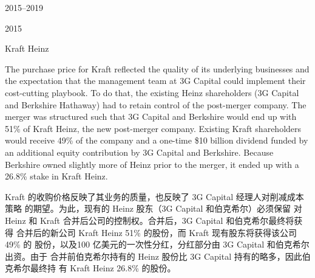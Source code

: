 \begin{chapter}{2015--2019}
\begin{section}{2015}
\begin{subsection}{Kraft Heinz}
\begin{verseparallel}
  {

    The purchase price for Kraft reflected the quality of its underlying
    businesses and the expectation that the management team at 3G Capital could
    implement their cost-cutting playbook. To do that, the existing Heinz
    shareholders (3G Capital and Berkshire Hathaway) had to retain control of
    the post-merger company. The merger was structured such that 3G Capital and
    Berkshire would end up with 51\% of Kraft Heinz, the new post-merger
    company. Existing Kraft shareholders would receive 49\% of the company and a
    one-time \$10 billion dividend funded by an additional equity contribution
    by 3G Capital and Berkshire. Because Berkshire owned slightly more of Heinz
    prior to the merger, it ended up with a 26.8\% stake in Kraft Heinz. \\

  }
  {
    Kraft 的收购价格反映了其业务的质量，也反映了 3G Capital 经理人对削减成本策略
    的期望。为此，现有的 Heinz 股东（3G Capital 和伯克希尔）必须保留
    对 Heinz 和 Kraft 合并后公司的控制权。合并后，3G Capital 和伯克希尔最终将获得
    合并后的新公司 Kraft Heinz 51\% 的股份，而 Kraft 现有股东将获得该公司 49\% 的
    股份，以及100 亿美元的一次性分红，分红部分由 3G Capital 和伯克希尔出资。由于
    合并前伯克希尔持有的 Heinz 股份比 3G Capital 持有的略多，因此伯克希尔最终持
    有 Kraft Heinz 26.8\% 的股份。
  }
\end{verseparallel}


\end{subsection}
\end{section}
\end{chapter}
